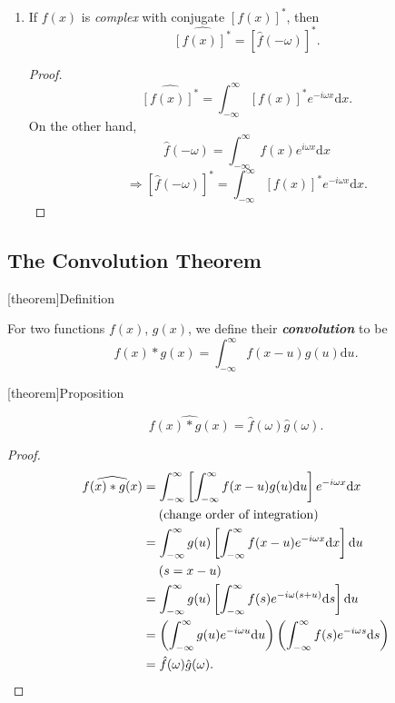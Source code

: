 \documentclass[12pt]{report}
\theoremstyle{definition}
\begin{document}
\begin{enumerate}[label = (\roman*)]
\begin{enumerate}[label = (\alph*)]
        \end{enumerate}

    \item If $f(x)$ is \emph{complex} with conjugate ${[f(x)]}^{*}$, then\[
            \widehat{{[f(x)]}^{*}} = {[\hat{f}(-\omega)]}^{*}.
        \]
        \begin{proof}
            \[
                \widehat{{[f(x)]}^{*}} = \int_{-\infty}^{\infty} {[f(x)]}^{*}e^{-i\omega x}\mathrm{d}x.
            \]
            On the other hand,\[
                \hat{f}(-\omega) = \int_{-\infty}^{\infty} f(x)e^{i\omega x}\mathrm{d}x
            \]\[
            \Rightarrow{}{[\hat{f}(-\omega)]}^{*} = \int_{-\infty}^{\infty} {[f(x)]}^{*}e^{-i\omega x}\mathrm{d}x.
            \]
        \end{proof} 
\end{enumerate}

\subsection{The Convolution Theorem}

[theorem]{Definition}
\begin{convolution}
    For two functions $f(x)$, $g(x)$, we define their \textbf{\emph{convolution}} to be\[
        f(x)*g(x) = \int_{-\infty}^{\infty} f(x-u)g(u)\mathrm{d}u.
    \]
\end{convolution}

[theorem]{Proposition}
\begin{convolution property}
    \[
        \widehat{f(x)*g(x)} = \hat{f}(\omega)\hat{g}(\omega).
    \]
\end{convolution property}

\begin{proof}
    \begin{align*}
        \widehat{f(x)*g(x)} 
        & = \int_{-\infty}^{\infty} \left[\int_{-\infty}^{\infty} f(x-u)g(u)\mathrm{d}u\right]
        e^{-i\omega x}\mathrm{d}x \\
        & \quad\;\textnormal{(change order of integration)}\;\\
        & = \int_{-\infty}^{\infty} g(u)\left[\int_{-\infty}^{\infty} 
        f(x-u)e^{-i\omega x}\mathrm{d}x\right]\mathrm{d}u \\
        & \quad\;(s = x-u) \\
        & = \int_{-\infty}^{\infty} g(u) \left[\int_{-\infty}^{\infty} 
        f(s)e^{-i\omega(s+u)}\mathrm{d}s\right]\mathrm{d}u \\
        & = \left(\int_{-\infty}^{\infty} g(u)e^{-i\omega u}\mathrm{d}u\right)
        \left(\int_{-\infty}^{\infty} f(s)e^{-i\omega s}\mathrm{d}s\right) \\
        & = \hat{f}(\omega)\hat{g}(\omega).
    \end{align*} 
\end{proof} 
\end{document}

